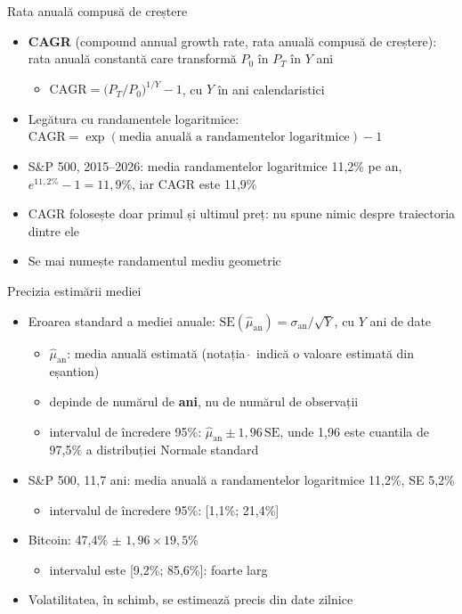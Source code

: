 \begin{frame}{Rata anuală compusă de creștere}
\itemsize{\small}
\begin{itemize}
    \item \textbf{CAGR} (compound annual growth rate, rata anuală compusă de creștere): rata anuală constantă care transformă $P_0$ în $P_T$ în $Y$ ani
    \begin{itemize}
        \item $\text{CAGR} = \big(P_T / P_0\big)^{1/Y} - 1$, cu $Y$ în ani calendaristici
    \end{itemize}
    \item Legătura cu randamentele logaritmice: $\text{CAGR} = \exp(\text{media anuală a randamentelor logaritmice}) - 1$
    \item S\&P 500, 2015--2026: media randamentelor logaritmice 11{,}2\% pe an, $e^{11{,}2\%} - 1 = 11{,}9\%$, iar CAGR este 11{,}9\%
    \item CAGR folosește doar primul și ultimul preț: nu spune nimic despre traiectoria dintre ele
    \item Se mai numește randamentul mediu geometric
\end{itemize}
\end{frame}

\begin{frame}{Precizia estimării mediei}
\itemsize{\small}
\begin{itemize}
    \item Eroarea standard a mediei anuale: $\text{SE}(\hat\mu_{\text{an}}) = \sigma_{\text{an}} / \sqrt{Y}$, cu $Y$ ani de date
    \begin{itemize}
        \item $\hat\mu_{\text{an}}$: media anuală estimată (notația $\hat{\ }$ indică o valoare estimată din eșantion)
        \item depinde de numărul de \textbf{ani}, nu de numărul de observații
        \item intervalul de încredere 95\%: $\hat\mu_{\text{an}} \pm 1{,}96\,\text{SE}$, unde 1,96 este cuantila de 97,5\% a distribuției Normale standard
    \end{itemize}
    \item S\&P 500, 11{,}7 ani: media anuală a randamentelor logaritmice 11{,}2\%, SE 5{,}2\%
    \begin{itemize}
        \item intervalul de încredere 95\%: [1{,}1\%; 21{,}4\%]
    \end{itemize}
    \item Bitcoin: 47{,}4\% $\pm$ $1{,}96 \times 19{,}5\%$
    \begin{itemize}
        \item intervalul este [9{,}2\%; 85{,}6\%]: foarte larg
    \end{itemize}
    \item Volatilitatea, în schimb, se estimează precis din date zilnice
\end{itemize}
\end{frame}

